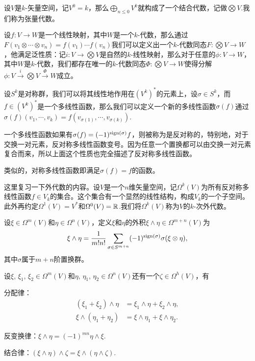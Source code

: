 \para 设$V$是$k$-矢量空间，记$V^0=k$，那么$\bigoplus_{n\leq 0} V^k$就构成了一个结合代数，记做$\bigotimes V$.我们称为张量代数。

设$f:V\to W$是一个线性映射，其中$W$是一个$k$-代数，那么通过$F(v_1\otimes \cdots \otimes v_n)=f(v_1)\cdots f(v_n)$我们可以定义出一个$k$-代数同态$F:\bigotimes V\to W$，他满足泛性质：记$i:V\to \bigotimes V$是自然的$k$-线性映射，那么对于任意的$\phi:V\to W$，其中$W$是$k$-代数，我们都存在唯一的$k$-代数同态$\Phi:\bigotimes V\to W$使得分解$\phi:V\xrightarrow{i}\bigotimes V \xrightarrow{\Phi}W$成立。

\para 设$S^k$是对称群，我们可以将其线性地作用在$(V^k)^*$的元素上，设$\sigma\in S^k$，而$f\in (V^k)^*$是一个多线性函数，那么我们可以定义一个新的多线性函数$\sigma(f)$通过$\sigma(f)(v_1,\cdots,v_k)=f(v_{\sigma(1)},\cdots,v_{\sigma(k)})$.

一个多线性函数如果有$\sigma(f)=(-1)^{\operatorname{sign}(\sigma)}f$，则被称为是反对称的，特别地，对于交换一对元素，反对称多线性函数变号。因为任意一个置换都可以由交换一对元素复合而来，所以上面这个性质也完全描述了反对称多线性函数。

类似的，对称多线性函数即满足$\sigma(f)=f$的函数。

\para 这里复习一下外代数的内容。设$V$是一个$n$维矢量空间，记$\Omega^k(V)$为所有反对称多线性函数$f\in V_k$的集合。这个集合有一个显然的线性结构，构成$V_k$的一个子空间。此外再约定$\Omega^1(V)=V^*$和$\Omega^0(V)=\mathbb{R}$.我们将$\Omega^k(V)$称为$V$的$k$-次外代数。

\para 	设$\xi \in \Omega^m(V)$和$\eta \in \Omega^n(V)$，定义$\xi$和$\eta$的外积$\xi \wedge \eta \in \Omega^{m+n}(V)$为
	\[
		\xi \wedge \eta=\frac{1}{m!n!}\sum_{\sigma\in S^{m+n}}(-1)^{\operatorname{sign}(\sigma)}\sigma (\xi \otimes \eta),
	\]
	其中$\sigma$属于$m+n$阶置换群。

\begin{pro}
设$\xi$, $\xi_1$, $\xi_2 \in \Omega^m(V)$和$\eta$, $\eta_1$, $\eta_2\in \Omega^n(V)$还有一个$\zeta\in \Omega^h(V)$，有

	分配律：
	\[
		\begin{split}
			(\xi_1+\xi_2)\wedge \eta&=\xi_1 \wedge \eta+\xi_2 \wedge \eta, \\
			\xi \wedge (\eta_1+\eta_2)&=\xi \wedge \eta_1+\xi \wedge \eta_2.
		\end{split}
	\]

	反变换律：$\xi \wedge \eta=(-1)^{mn}\eta \wedge \xi$.

	结合律：$(\xi \wedge \eta)\wedge \zeta=\xi \wedge (\eta\wedge \zeta)$.
\end{pro}

